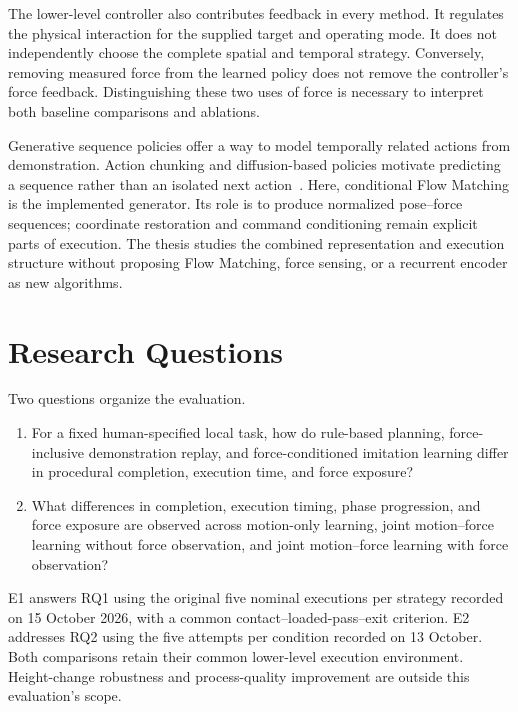 The lower-level controller also contributes feedback in every method. It regulates the physical interaction for the supplied target and operating mode. It does not independently choose the complete spatial and temporal strategy. Conversely, removing measured force from the learned policy does not remove the controller's force feedback. Distinguishing these two uses of force is necessary to interpret both baseline comparisons and ablations.

Generative sequence policies offer a way to model temporally related actions from demonstration. Action chunking and diffusion-based policies motivate predicting a sequence rather than an isolated next action~\cite{zhao2023act,chi2023diffusionpolicy}. Here, conditional Flow Matching is the implemented generator. Its role is to produce normalized pose--force sequences; coordinate restoration and command conditioning remain explicit parts of execution. The thesis studies the combined representation and execution structure without proposing Flow Matching, force sensing, or a recurrent encoder as new algorithms.

\section{Research Questions}
Two questions organize the evaluation.
\begin{enumerate}[label=\textbf{RQ\arabic*:},leftmargin=1.8cm]
\item For a fixed human-specified local task, how do rule-based planning, force-inclusive demonstration replay, and force-conditioned imitation learning differ in procedural completion, execution time, and force exposure?
\item What differences in completion, execution timing, phase progression, and force exposure are observed across motion-only learning, joint motion--force learning without force observation, and joint motion--force learning with force observation?
\end{enumerate}
E1 answers RQ1 using the original five nominal executions per strategy recorded on 15 October 2026, with a common contact--loaded-pass--exit criterion. E2 addresses RQ2 using the five attempts per condition recorded on 13 October. Both comparisons retain their common lower-level execution environment. Height-change robustness and process-quality improvement are outside this evaluation's scope.

